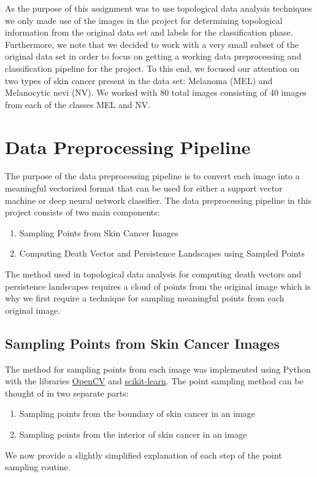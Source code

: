 \documentclass[11pt, reqno]{amsart}
\theoremstyle{plain}
\theoremstyle{definition}
\begin{document}
As the purpose of this assignment was to use topological data analysis techniques we only made use of the images in the project for determining topological information from the original data set and labels for the classification phase. Furthermore, we note that we decided to work with a very small subset of the original data set in order to focus on getting a working data preprocessing and classification pipeline for the project. To this end, we focused our attention on two types of skin cancer present in the data set: Melanoma (MEL) and Melanocytic nevi (NV). We worked with 80 total images consisting of 40 images from each of the classes MEL and NV.


\section{Data Preprocessing Pipeline}

The purpose of the data preprocessing pipeline is to convert each image into a meaningful vectorized format that can be used for either a support vector machine or deep neural network classifier. The data preprocessing pipeline in this project consists of two main components:
\begin{enumerate}
    \item Sampling Points from Skin Cancer Images
    \item Computing Death Vector and Persistence Landscapes using Sampled Points
\end{enumerate}
The method used in topological data analysis for computing death vectors and persistence landscapes requires a cloud of points from the original image which is why we first require a technique for sampling meaningful points from each original image.

\subsection{Sampling Points from Skin Cancer Images}

The method for sampling points from each image was implemented using Python with the libraries \href{https://pypi.org/project/opencv-python/}{OpenCV} and \href{https://scikit-learn.org/stable/}{scikit-learn}. The point sampling method can be thought of in two separate parts:
\begin{enumerate}
    \item Sampling points from the boundary of skin cancer in an image
    \item Sampling points from the interior of skin cancer in an image
\end{enumerate}
We now provide a slightly simplified explanation of each step of the point sampling routine. 
\end{document}
